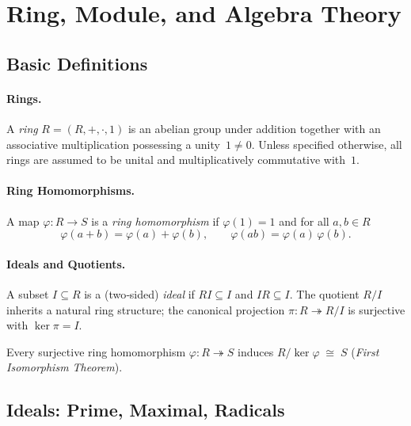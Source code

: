 \section{Ring, Module, and Algebra Theory}

\subsection{Basic Definitions}

\paragraph{Rings.}
A \emph{ring} \(R=(R,+,\cdot,1)\) is an abelian group under addition together with an associative
multiplication possessing a unity~\(1\neq 0\).
Unless specified otherwise, all rings are assumed to be unital and
multiplicatively commutative with~\(1\).

\paragraph{Ring Homomorphisms.}
A map \(\varphi:R\!\to\!S\) is a \emph{ring homomorphism} if
\(\varphi(1)=1\) and for all \(a,b\in R\)
\[
\varphi(a+b)=\varphi(a)+\varphi(b),\qquad
\varphi(ab)=\varphi(a)\,\varphi(b).
\]

\paragraph{Ideals and Quotients.}
A subset \(I\subseteq R\) is a (two‑sided) \emph{ideal} if
\(RI\subseteq I\) and \(IR\subseteq I\).
The quotient \(R/I\) inherits a natural ring structure;
the canonical projection \(\pi:R\!\twoheadrightarrow\!R/I\) is surjective with
\(\ker\pi = I\).

\medskip
Every surjective ring homomorphism \(\varphi:R\!\twoheadrightarrow\!S\) induces
\(R/\ker\varphi\;\cong\;S\) (\emph{First Isomorphism Theorem}).

\subsection{Ideals: Prime, Maximal, Radicals}

